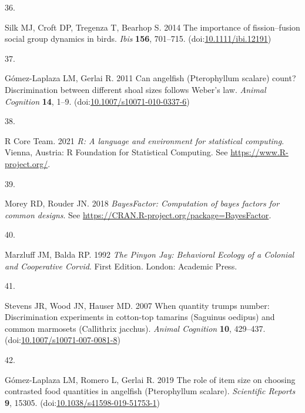 \documentclass[
  ,doc,floatsintext]{apa6}
\newlength{\cslhangindent}
\newlength{\csllabelwidth}
\newlength{\cslentryspacingunit} %
\newenvironment{CSLReferences}[2] %
 {%
  \setlength{\parindent}{0pt}
  \ifodd #1
  \let\oldpar\par
  \def\par{\hangindent=\cslhangindent\oldpar}
  \fi
  \setlength{\parskip}{#2\cslentryspacingunit}
 }%
 {}
\newcommand{\CSLLeftMargin}[1]{\parbox[t]{\csllabelwidth}{#1}}
\newcommand{\CSLRightInline}[1]{\parbox[t]{\linewidth - \csllabelwidth}{#1}\break}
\begin{document}
\begin{CSLReferences}{0}{0}
\leavevmode{}%
\CSLLeftMargin{36. }
\CSLRightInline{Silk MJ, Croft DP, Tregenza T, Bearhop S. 2014 The importance of fission--fusion social group dynamics in birds. \emph{Ibis} \textbf{156}, 701--715. (doi:\href{https://doi.org/10.1111/ibi.12191}{10.1111/ibi.12191})}

\leavevmode{}%
\CSLLeftMargin{37. }
\CSLRightInline{Gómez-Laplaza LM, Gerlai R. 2011 Can angelfish ({Pterophyllum} scalare) count? {Discrimination} between different shoal sizes follows {Weber}'s law. \emph{Animal Cognition} \textbf{14}, 1--9. (doi:\href{https://doi.org/10.1007/s10071-010-0337-6}{10.1007/s10071-010-0337-6})}

\leavevmode{}%
\CSLLeftMargin{38. }
\CSLRightInline{R Core Team. 2021 \emph{R: A language and environment for statistical computing}. Vienna, Austria: R Foundation for Statistical Computing. See \url{https://www.R-project.org/}.}

\leavevmode{}%
\CSLLeftMargin{39. }
\CSLRightInline{Morey RD, Rouder JN. 2018 \emph{BayesFactor: Computation of bayes factors for common designs}. See \url{https://CRAN.R-project.org/package=BayesFactor}.}

\leavevmode{}%
\CSLLeftMargin{40. }
\CSLRightInline{Marzluff JM, Balda RP. 1992 \emph{The {Pinyon} {Jay}: {Behavioral} {Ecology} of a {Colonial} and {Cooperative} {Corvid}}. First Edition. London: Academic Press. }

\leavevmode{}%
\CSLLeftMargin{41. }
\CSLRightInline{Stevens JR, Wood JN, Hauser MD. 2007 When quantity trumps number: Discrimination experiments in cotton-top tamarins ({Saguinus} oedipus) and common marmosets ({Callithrix} jacchus). \emph{Animal Cognition} \textbf{10}, 429--437. (doi:\href{https://doi.org/10.1007/s10071-007-0081-8}{10.1007/s10071-007-0081-8})}

\leavevmode{}%
\CSLLeftMargin{42. }
\CSLRightInline{Gómez-Laplaza LM, Romero L, Gerlai R. 2019 The role of item size on choosing contrasted food quantities in angelfish ({Pterophyllum} scalare). \emph{Scientific Reports} \textbf{9}, 15305. (doi:\href{https://doi.org/10.1038/s41598-019-51753-1}{10.1038/s41598-019-51753-1})}

\end{CSLReferences}
\end{document}
